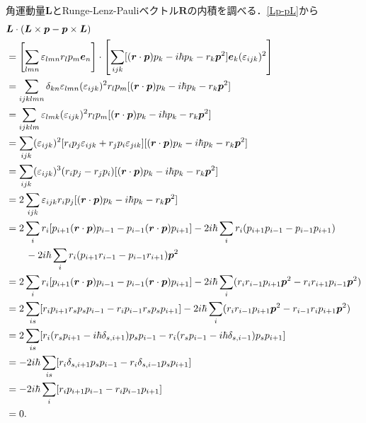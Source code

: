 角運動量$\boldsymbol{L}$とRunge-Lenz-Pauliベクトル$\boldsymbol{R}$の内積を調べる．\eqref{Lp-pL}から
\begin{align}
  & \boldsymbol{L}\cdot(\boldsymbol{L}\times\boldsymbol{p} - \boldsymbol{p}\times\boldsymbol{L})\\
  & = \left[\sum_{lmn}\varepsilon_{lmn}r_lp_m\boldsymbol{e}_n\right]\cdot\left[\sum_{ijk}[(\boldsymbol{r}\cdot\boldsymbol{p})p_k - i\hbar p_k - r_k\boldsymbol{p}^2]\boldsymbol{e}_k(\varepsilon_{ijk})^2\right]\notag\\
  & = \sum_{ijklmn}\delta_{kn}\varepsilon_{lmn}(\varepsilon_{ijk})^2r_lp_m[(\boldsymbol{r}\cdot\boldsymbol{p})p_k - i\hbar p_k - r_k\boldsymbol{p}^2]\notag\\
  & = \sum_{ijklm}\varepsilon_{lmk}(\varepsilon_{ijk})^2r_lp_m[(\boldsymbol{r}\cdot\boldsymbol{p})p_k - i\hbar p_k - r_k\boldsymbol{p}^2]\notag\\
  & = \sum_{ijk}(\varepsilon_{ijk})^2[r_ip_j\varepsilon_{ijk} + r_jp_i\varepsilon_{jik}][(\boldsymbol{r}\cdot\boldsymbol{p})p_k - i\hbar p_k - r_k\boldsymbol{p}^2]\notag\\
  & = \sum_{ijk}(\varepsilon_{ijk})^3(r_ip_j - r_jp_i)[(\boldsymbol{r}\cdot\boldsymbol{p})p_k - i\hbar p_k - r_k\boldsymbol{p}^2]\notag\\
  & = 2\sum_{ijk}\varepsilon_{ijk}r_ip_j[(\boldsymbol{r}\cdot\boldsymbol{p})p_k - i\hbar p_k - r_k\boldsymbol{p}^2]\notag\\
  & = 2\sum_i r_i[p_{i + 1}(\boldsymbol{r}\cdot\boldsymbol{p})p_{i - 1} - p_{i - 1}(\boldsymbol{r}\cdot\boldsymbol{p})p_{i + 1}] - 2i\hbar\sum_i r_i(p_{i + 1}p_{i - 1} - p_{i - 1}p_{i + 1})\notag\\
  & \qquad - 2i\hbar\sum_i r_i(p_{i + 1}r_{i - 1} - p_{i - 1}r_{i + 1})\boldsymbol{p}^2\notag\\
  & = 2\sum_i r_i[p_{i + 1}(\boldsymbol{r}\cdot\boldsymbol{p})p_{i - 1} - p_{i - 1}(\boldsymbol{r}\cdot\boldsymbol{p})p_{i + 1}] - 2i\hbar\sum_i(r_ir_{i - 1}p_{i + 1}\boldsymbol{p}^2 - r_ir_{i + 1}p_{i - 1}\boldsymbol{p}^2)\notag\\
  & = 2\sum_{is}[r_ip_{i + 1}r_sp_sp_{i - 1} - r_ip_{i - 1}r_sp_sp_{i + 1}] - 2i\hbar\sum_i(r_ir_{i - 1}p_{i + 1}\boldsymbol{p}^2 - r_{i - 1}r_ip_{i + 1}\boldsymbol{p}^2)\notag\\
  & = 2\sum_{is}[r_i(r_sp_{i + 1} - i\hbar\delta_{s,i + 1})p_sp_{i - 1} - r_i(r_sp_{i - 1} - i\hbar\delta_{s,i - 1})p_sp_{i + 1}]\notag\\
  & = - 2i\hbar\sum_{is}[r_i\delta_{s,i + 1}p_sp_{i - 1} - r_i\delta_{s,i - 1}p_sp_{i + 1}]\notag\\
  & = - 2i\hbar\sum_i[r_ip_{i + 1}p_{i - 1} - r_ip_{i - 1}p_{i + 1}]\notag\\
  & =0.\label{LpL-Lp}
\end{align}

